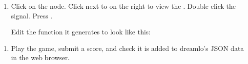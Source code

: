 \documentclass[a4paper,12pt,english]{sphinxmanual}
\begin{document}
\begin{sphinxVerbatim}[commandchars=\\\{\}]
\end{sphinxVerbatim}
\begin{enumerate}
%
\setcounter{enumi}{4}
\item {} 
\sphinxAtStartPar
Click on the  node. Click  next to 
on the right to view the . Double click the
 signal. Press .

\sphinxAtStartPar
Edit the function it generates to look like this:

\end{enumerate}

\begin{sphinxVerbatim}[commandchars=\\\{\}]
    
\end{sphinxVerbatim}
\begin{enumerate}
%
\setcounter{enumi}{5}
\item {} 
\sphinxAtStartPar
Play the game, submit a score, and check it is added to dreamlo’s
JSON data in the web browser.

\end{enumerate}
\end{document}
